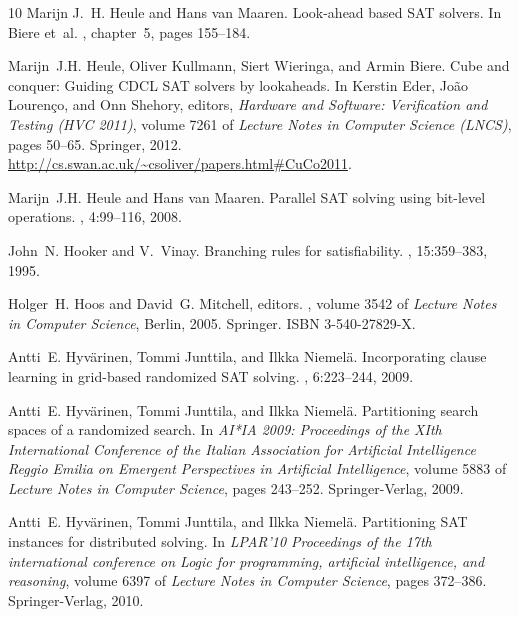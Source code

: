 \documentclass[final,3p,times]{elsarticle}
\theoremstyle{definition}
\begin{document}
\begin{thebibliography}{10}
Marijn J.~H. Heule and Hans van Maaren.
\newblock Look-ahead based {SAT} solvers.
\newblock In Biere et~al. \cite{2008HandbuchSAT}, chapter~5, pages 155--184.

Marijn~J.H. Heule, Oliver Kullmann, Siert Wieringa, and Armin Biere.
\newblock Cube and conquer: Guiding {CDCL} {SAT} solvers by lookaheads.
\newblock In Kerstin Eder, Jo{\~{a}}o Louren{\c{c}}o, and Onn Shehory, editors,
  {\em Hardware and Software: Verification and Testing (HVC 2011)}, volume 7261
  of {\em Lecture Notes in Computer Science (LNCS)}, pages 50--65. Springer,
  2012.
\newblock \url{http://cs.swan.ac.uk/~csoliver/papers.html#CuCo2011}.

Marijn~J.H. Heule and Hans van Maaren.
\newblock Parallel {SAT} solving using bit-level operations.
,
  4:99--116, 2008.

John~N. Hooker and V.~Vinay.
\newblock Branching rules for satisfiability.
, 15:359--383, 1995.

Holger~H. Hoos and David~G. Mitchell, editors.
, volume
  3542 of {\em Lecture Notes in Computer Science}, Berlin, 2005. Springer.
\newblock ISBN 3-540-27829-X.

Antti~E. Hyv{\"a}rinen, Tommi Junttila, and Ilkka Niemel{\"a}.
\newblock Incorporating clause learning in grid-based randomized {SAT} solving.
,
  6:223--244, 2009.

Antti~E. Hyv{\"a}rinen, Tommi Junttila, and Ilkka Niemel{\"a}.
\newblock Partitioning search spaces of a randomized search.
\newblock In {\em AI*IA 2009: Proceedings of the XIth International Conference
  of the Italian Association for Artificial Intelligence Reggio Emilia on
  Emergent Perspectives in Artificial Intelligence}, volume 5883 of {\em
  Lecture Notes in Computer Science}, pages 243--252. Springer-Verlag, 2009.

Antti~E. Hyv{\"a}rinen, Tommi Junttila, and Ilkka Niemel{\"a}.
\newblock Partitioning {SAT} instances for distributed solving.
\newblock In {\em LPAR'10 Proceedings of the 17th international conference on
  Logic for programming, artificial intelligence, and reasoning}, volume 6397
  of {\em Lecture Notes in Computer Science}, pages 372--386. Springer-Verlag,
  2010.


\end{thebibliography}
\end{document}

